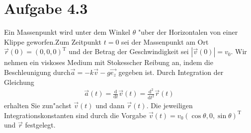 \documentclass{theozettel}
\begin{document}
\section*{Aufgabe 4.3}Ein Massenpunkt wird unter dem Winkel $\theta$ "uber der Horizontalen von einer Klippe geworfen.Zum Zeitpunkt $t= 0$ sei der Massenpunkt am Ort $\vec{r}\left(0\right) = \left(0,0,0\right)^\text{T}$ und der Betrag der Geschwindigkeit sei $\left|\vec{v}\left(0\right)\right|=v_0$. Wir nehmen ein viskoses Medium mit Stokesscher Reibung an, indem die Beschleunigung durch$\vec{a}=-k\vec{v}-g\vec{e_z}$ gegeben ist. Durch Integration der Gleichung
\begin{align*}
\vec{a}\left(t\right)=\frac{\text{d}}{\text{d}t}\vec{v}\left(t\right)=\frac{\text{d}^2}{\text{d}t^2}\vec{r}\left(t\right)
\end{align*}
erhalten Sie zun"achst $\vec{v}\left(t\right)$ und dann $\vec{r}\left(t\right)$. Die jeweiligen Integrationskonstanten sind durch die Vorgabe  $\vec{v}\left(t\right)= v_0\left(\cos \theta,0,\sin\theta\right)^\text{T}$ und $\vec{r}$ festgelegt.
\end{document}
